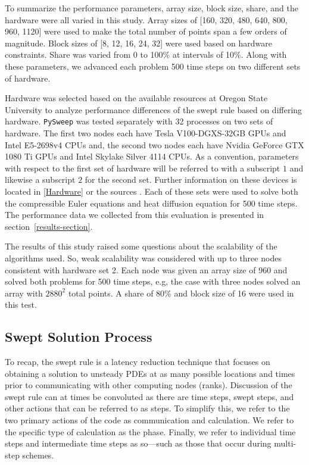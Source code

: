 \documentclass[review]{elsarticle}
\def\oldCPU{s}
\def\oldGPU{s}
\def\newCPU{s}
\def\newGPU{s}
\def\pysweep{\texttt{PySweep}}
\def\oldCPU{Intel Skylake Silver 4114} %
\def\oldGPU{Nvidia GeForce GTX 1080 Ti}
\def\newCPU{Intel E5-2698v4} %
\def\newGPU{Tesla V100-DGXS-32GB}
\begin{document}
\par
To summarize the performance parameters, array size, block size, share, and the hardware were all varied in this study. Array sizes of [160, 320, 480, 640, 800, 960, 1120] were used to make the total number of points span a few orders of magnitude. Block sizes of [8, 12, 16, 24, 32] were used based on hardware constraints. Share was varied from 0 to 100\% at intervals of 10\%. Along with these parameters, we advanced each problem 500 time steps on two different sets of hardware.

\par
Hardware was selected based on the available resources at Oregon State University to analyze performance differences of the swept rule based on differing hardware. \pysweep{} was tested separately with 32 processes on two sets of hardware. The first two nodes each have \newGPU{} GPUs and \newCPU{} CPUs and, the second two nodes each have \oldGPU{} GPUs and \oldCPU{} CPUs. As a convention, parameters with respect to the first set of hardware will be referred to with a subscript $1$ and likewise a subscript $2$ for the second set. Further information on these devices is located in \ref{Hardware} or the sources \cite{Intel123550,Intel91753,NVIDIANVIDIA,GeForceGeForce}. Each of these sets were used to solve both the compressible Euler equations and heat diffusion equation for 500 time steps. The performance data we collected from this evaluation is presented in section~\ref{results-section}. 

\par 
The results of this study raised some questions about the scalability of the algorithms used. So, weak scalability was considered with up to three nodes consistent with hardware set 2. Each node was given an array size of 960 and solved both problems for 500 time steps, e.g, the case with three nodes solved an array with $2880^2$ total points. A share of 80\% and block size of 16 were used in this test. 

\subsection{Swept Solution Process}
\label{swept-process-section}
To recap, the swept rule is a latency reduction technique that focuses on obtaining a solution to unsteady PDEs at as many possible locations and times prior to communicating with other computing nodes (ranks). Discussion of the swept rule can at times be convoluted as there are time steps, swept steps, and other actions that can be referred to as steps. To simplify this, we refer to the two primary actions of the code as communication and calculation. We refer to the specific type of calculation as the phase. Finally, we refer to individual time steps and intermediate time steps as so---such as those that occur during multi-step schemes. 
\end{document}
